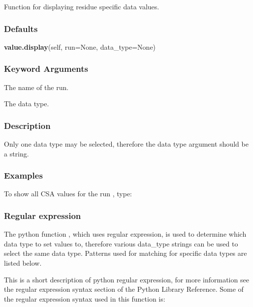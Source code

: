 Function for displaying residue specific data values.

\subsubsection{Defaults}

\textsf{\textbf{value.display}(self, run=None, data\_type=None)}


\subsubsection{Keyword Arguments}


  The name of the run.

  The data type.

\subsubsection{Description}

Only one data type may be selected, therefore the data type argument should be a string.


\subsubsection{Examples}

To show all CSA values for the run 
, type:






\subsubsection{Regular expression}

The python function 
, which uses regular expression, is used to determine which data
type to set values to, therefore various data\_type strings can be used to select the same
data type.  Patterns used for matching for specific data types are listed below.

This is a short description of python regular expression, for more information see the
regular expression syntax section of the Python Library Reference.  Some of the regular
expression syntax used in this function is:

